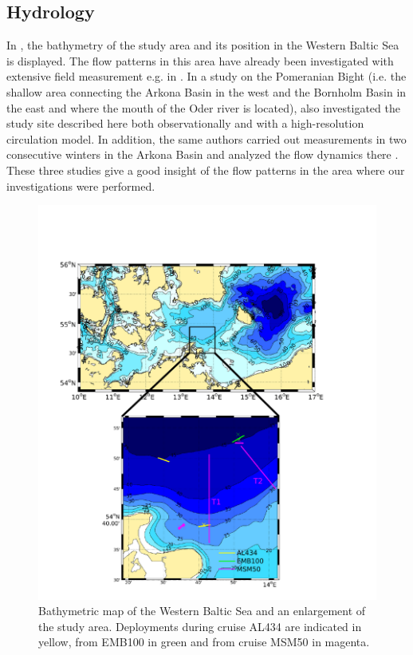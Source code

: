 \subsection{Hydrology}

In , the bathymetry of the study area and its position in the 
Western Baltic Sea is displayed. The flow patterns in this area have already 
been investigated with extensive field measurement e.g. in \cite{lass1993}. In 
a study on the Pomeranian Bight (i.e. the shallow area connecting the Arkona 
Basin in the west and the Bornholm Basin in the east and where the mouth of the 
Oder river is located), \cite{lass2001} also investigated the study site 
described here both observationally and with a high-resolution circulation 
model. In addition, the same authors carried out measurements in two consecutive 
winters in the Arkona Basin and analyzed the flow dynamics there 
\citep[][]{lass2003}. These three studies give a good insight 
of the flow patterns in the area where our investigations were performed.
 
 \begin{figure}[ht]
 \centering
\includegraphics[width=18cm]{bilder/studyarea.pdf}
 \caption{Bathymetric map of the Western Baltic Sea and an enlargement of the 
study area. Deployments during cruise AL434 are indicated in yellow, from 
EMB100 in green and from cruise MSM50 in magenta.}
 \label{studyarea}
 \end{figure}

